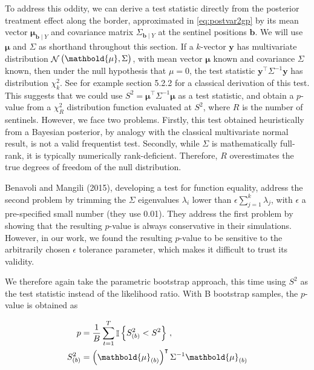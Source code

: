 \documentclass[letter]{article}
\DeclareMathOperator{\Ind}{\mathbb{I}}
\DeclareMathOperator{\normal}{\mathcal{N}}
\newcommand{\trans}{^{\intercal}}
\newcommand{\yvec}{\mathbold{y}}
\newcommand{\muvec}{\mathbold{\mu}}
\newcommand{\sentinels}{\bm{b}}
\newcommand{\numsent}{R}
\renewcommand{\cite}[1]{\citep{#1}}
\begin{document}
To address this oddity, we can derive a test statistic directly from the posterior treatment effect along the border,
approximated in \eqref{eq:postvar2gp} by its mean vector \(\muvec_{\sentinels \mid Y}\)
and covariance matrix \(\Sigma_{\sentinels \mid Y}\) at the sentinel positions \(\sentinels\).
We will use \(\muvec\) and \(\Sigma\) as shorthand throughout this section.
If a \(k\)-vector \(\yvec\) has multivariate distribution \(\normal\del{\muvec, \Sigma}\), with mean vector \(\muvec\) known and covariance \(\Sigma\) known, then under the null hypothesis that \(\mu=0\), the test statistic \(\yvec\trans \Sigma^{-1} \yvec\) has distribution \(\chi^2_k\).
See for example \cite{rencher2003methods} section 5.2.2 for a classical derivation of this test.
This suggests that we could use \(S^2=\muvec\trans \Sigma^{-1} \muvec\) as a test statistic,
and obtain a \(p\)-value from a \(\chi^2_\numsent\) distribution function evaluated at \(S^2\), where \(\numsent\) is the number of sentinels.
However, we face two problems.
Firstly, this test obtained heuristically from a Bayesian posterior, by analogy with the classical multivariate normal result, is not a valid frequentist test.
Secondly, while \(\Sigma\) is mathematically full-rank, it is typically numerically rank-deficient.
Therefore, \(\numsent\) overestimates the true degrees of freedom of the null distribution.

Benavoli and Mangili (2015), developing a test for function equality, address the second problem by trimming the \(\Sigma\) eigenvalues \(\lambda_i\) lower than \(\epsilon \sum_{j=1}^k \lambda_j\), with \(\epsilon\) a pre-specified small number (they use 0.01).
They address the first problem by showing that the resulting \(p\)-value is always conservative in their simulations.
However, in our work, we found the resulting \(p\)-value to be sensitive to the arbitrarily chosen \(\epsilon\) tolerance parameter, which makes it difficult to trust its validity.

We therefore again take the parametric bootstrap approach, this time using \(S^2\) as the test statistic instead of the likelihood ratio.
With B bootstrap samples, the \(p\)-value is obtained as

\begin{equation}
\begin{split}
    p &= \frac{1}{B} \sum_{t=1}^T \Ind\cbr{S_{(b)}^2 < S^2}\,,\\
    S_{(b)}^2 &= \del{ \muvec_{(b)} }\trans \Sigma^{-1} \muvec_{(b)}
\end{split}
\end{equation}
\end{document}
